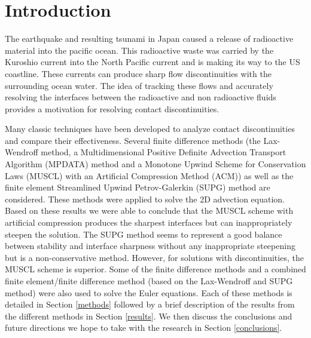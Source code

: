 \section{Introduction}
\label{intro}

The earthquake and resulting tsunami in Japan caused a release of radioactive material into the pacific ocean. This radioactive waste was carried by the Kuroshio current into the North Pacific current and is making its way to the US coastline. These currents can produce sharp flow discontinuities with the surrounding ocean water. The idea of tracking these flows and accurately resolving the  interfaces between the radioactive and non radioactive fluids provides a motivation for resolving contact discontinuities.

Many classic techniques have been developed to analyze contact discontinuities and compare their effectiveness. Several finite difference methods (the Lax-Wendroff method, a Multidimensional Positive Definite Advection Transport Algorithm (MPDATA) method and a Monotone Upwind Scheme for Conservation Laws (MUSCL) with an Artificial Compression Method (ACM)) as well as the finite element Streamlined Upwind Petrov-Galerkin (SUPG) method are considered. These methods were applied to solve the 2D advection equation. Based on these results we were able to conclude that the MUSCL scheme with artificial compression produces the sharpest interfaces but can inappropriately steepen the solution. The SUPG method seems to represent a good balance between stability and interface sharpness without any inappropriate steepening but is a non-conservative method. However, for solutions with discontinuities, the MUSCL scheme is superior. Some of the finite difference methods and a combined finite element/finite difference method (based on the Lax-Wendroff and SUPG method) were also used to solve the Euler equations. Each of these methods is detailed in Section \ref{methods} followed by a brief description of the results from the different methods in Section \ref{results}. We then discuss the conclusions and future directions we hope to take with the research in Section \ref{conclusions}.